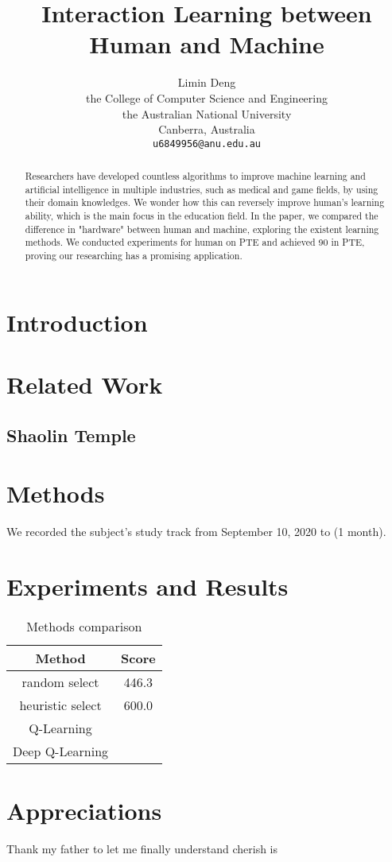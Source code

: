 \documentclass{article}
\title{Interaction Learning between Human and Machine}
\author{%
Limin Deng \\
the College of Computer Science and Engineering\\
 the Australian National University\\
  Canberra, Australia\\
  \texttt{u6849956@anu.edu.au} \\
}
\begin{document}
\maketitle

\begin{abstract}
Researchers have developed countless algorithms to improve machine learning and artificial intelligence in multiple industries, such as medical and game fields, by using their domain knowledges. We wonder how this can reversely improve human's learning ability, which is the main focus in the education field. In the paper, we compared the difference in "hardware" between human and machine, exploring the existent learning methods. We conducted experiments for human on PTE and achieved 90 in PTE, proving our researching has a promising application.
\end{abstract}



\section{Introduction}


\section{Related Work}

\subsection{Shaolin Temple}



\section{Methods}

We recorded the subject's study track from September 10, 2020 to (1 month). 


\section{Experiments and Results}



\begin{table}[!htp]
\centering
\begin{tabular}{c|c}
\toprule
Method & Score \\
\toprule
random select & 446.3 \\
\hline
heuristic select & 600.0 \\
\hline
Q-Learning & \\
\hline
Deep Q-Learning & \\
\bottomrule
\end{tabular}
\caption{Methods comparison}
\label{tab:methods}
\end{table}








\section{Appreciations}
Thank my father to let me finally understand cherish is 
\end{document}
